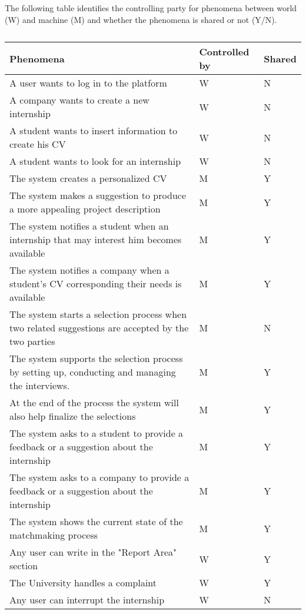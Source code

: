 \pagebreak
The following table identifies the controlling party for phenomena between world (W) and machine (M) and whether the phenomena is shared or not (Y/N).
\begin{center} %
    \begin{longtable}{|p{8.7cm}|p{3cm}|p{3cm}|}
        \caption[Phenomena Table]{}
        \label{table:phenomena}
        \endlastfoot
        \hline
        \rowcolor{gray!50}
        \textbf{Phenomena}                                                                                                                & \textbf{Controlled by} & \textbf{Shared} \\ \hline
        A user wants to log in to the platform & W & N \\ \hline
        A company wants to create a new internship & W & N \\ \hline
        A student wants to insert information to create  his CV   & W  & N \\ \hline
        A student wants to look for an internship & W  & N \\ \hline
        The system creates a personalized CV  & M  & Y \\ \hline
        The system makes a suggestion to produce a more appealing project description  & M  & Y \\ \hline
        The system notifies a student when an internship that may interest him becomes available & M  & Y \\ \hline
        The system notifies a company when a student's CV corresponding their needs is available & M  & Y \\ \hline
        The system starts a selection process when two related suggestions are accepted by the two parties & M  & N \\ \hline
        The system supports the selection process by setting up, conducting and managing the interviews. & M  & Y \\ \hline
        At the end of the process the system will also help finalize the selections & M  & Y 
        \\ \hline
        The system asks to a student to provide a feedback or a suggestion about the internship & M  & Y \\ \hline
        The system asks to a company to provide a feedback or a suggestion about the internship & M  & Y \\ \hline
        The system shows the current state of the matchmaking process & M  & Y \\ \hline
        Any user can write in the "Report Area" section & W  & Y \\ \hline
        The University handles a complaint & W  & Y \\ \hline
        Any user can interrupt the internship & W  & N \\ \hline
    \end{longtable}
\end{center}
\pagebreak

